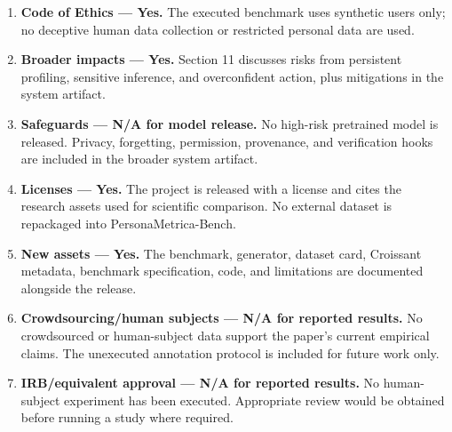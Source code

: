 \begin{enumerate}
  \texttt{reports/COMPUTE\_RESOURCES.md} report CPU, RAM, wall time, and
  peak-memory examples.
\item
  \textbf{Code of Ethics --- Yes.} The executed benchmark uses synthetic
  users only; no deceptive human data collection or restricted personal
  data are used.
\item
  \textbf{Broader impacts --- Yes.} Section 11 discusses risks from
  persistent profiling, sensitive inference, and overconfident action,
  plus mitigations in the system artifact.
\item
  \textbf{Safeguards --- N/A for model release.} No high-risk pretrained
  model is released. Privacy, forgetting, permission, provenance, and
  verification hooks are included in the broader system artifact.
\item
  \textbf{Licenses --- Yes.} The project is released with a license and
  cites the research assets used for scientific comparison. No external
  dataset is repackaged into PersonaMetrica-Bench.
\item
  \textbf{New assets --- Yes.} The benchmark, generator, dataset card,
  Croissant metadata, benchmark specification, code, and limitations are
  documented alongside the release.
\item
  \textbf{Crowdsourcing/human subjects --- N/A for reported results.} No
  crowdsourced or human-subject data support the paper's current
  empirical claims. The unexecuted annotation protocol is included for
  future work only.
\item
  \textbf{IRB/equivalent approval --- N/A for reported results.} No
  human-subject experiment has been executed. Appropriate review would
  be obtained before running a study where required.
\end{enumerate}

